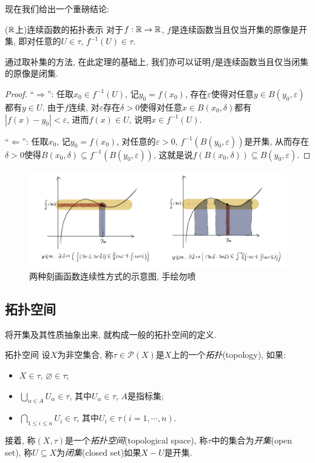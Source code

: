 现在我们给出一个重磅结论: 

\begin{theorem}{($\mathbb{R}$上)连续函数的拓扑表示}
	对于$f:\mathbb{R} \to \mathbb{R}$, $f$是连续函数当且仅当开集的原像是开集, 即对任意的$U\in \tau$, $f^{-1}(U) \in \tau$. 
\end{theorem}
\begin{remark}
	通过取补集的方法, 在此定理的基础上, 我们亦可以证明$f$是连续函数当且仅当闭集的原像是闭集. 
\end{remark}
\begin{proof}
	“$\Rightarrow$”: 任取$x_0 \in f^{-1}(U)$, 记$y_0=f(x_0)$, 存在$\varepsilon$使得对任意$y \in B(y_0,\varepsilon)$都有$y \in U$. 由于$f$连续, 对$\varepsilon$存在$\delta >0$使得对任意$x \in B(x_0,\delta)$都有$|f(x)-y_0|<\varepsilon$, 进而$f(x) \in U$, 说明$x \in f^{-1}(U)$. 
	
	“$\Leftarrow$”: 任取$x_0$, 记$y_0=f(x_0)$, 对任意的$\varepsilon >0$, $f^{-1}(B(y_0, \varepsilon))$是开集, 从而存在$\delta >0$使得$B(x_0,\delta) \subseteq f^{-1}(B(y_0, \varepsilon))$, 这就是说$f(B(x_0,\delta)) \subseteq B(y_0, \varepsilon)$. 
\end{proof}

\begin{figure}[H]
	\centering
	\includegraphics[width=16cm]{attachment/IMG_3539.jpg}
	\caption{两种刻画函数连续性方式的示意图, 手绘勿喷}
\end{figure}

\subsection{拓扑空间}

将开集及其性质抽象出来, 就构成一般的拓扑空间的定义. 

\begin{axiom}{拓扑空间}
	设$X$为非空集合, 称$\tau \in \mathcal{P}(X)$是$X$上的一个\textit{拓扑}(topology), 如果: 
	\begin{itemize}
		\item $X \in \tau$, $\varnothing \in \tau$; 
		\item $\bigcup_{\alpha \in A} U_{\alpha} \in \tau$, 其中$U_{\alpha} \in \tau$, $A$是指标集; 
		\item $\bigcap_{1 \leq i \leq n} U_i \in \tau$, 其中$U_i \in \tau(i=1,\cdots ,n)$. 
	\end{itemize}
	接着, 称$(X,\tau)$是一个\textit{拓扑空间}(topological space), 称$\tau$中的集合为\textit{开集}(open set), 称$U \subseteq X$为\textit{闭集}(closed set)如果$X - U$是开集. 
\end{axiom}

